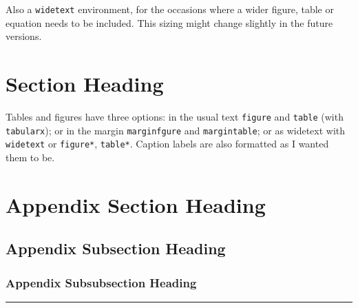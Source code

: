 \documentclass[10pt]{salam}
\begin{document}
Also a \texttt{widetext} environment, for the occasions where a wider figure, table or equation needs to be included. This sizing might change slightly in the future versions.
\begin{widetext}
  \lipsum[33]
\end{widetext}



\section{Section Heading}
\lipsum[13]


Tables and figures have three options: in the usual text \texttt{figure} and \texttt{table} (with \texttt{tabularx}); or in the margin \texttt{marginfgure} and \texttt{margintable}; or as widetext with \texttt{widetext} or \texttt{figure*}, \texttt{table*}. Caption labels are also formatted as I wanted them to be.

\appendix
\section{Appendix Section Heading}
\lipsum[11]

\subsection{Appendix Subsection Heading}
\lipsum[12]

  \subsubsection{Appendix Subsubsection Heading}
  \lipsum[13]

\begin{center}
  \vspace*{1em}
  \rule{0.8\textwidth}{1pt}
\end{center}

\nocite{*}
{\small }
\end{document}
